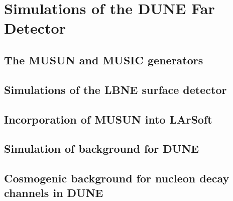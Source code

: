 
\chapter{Simulations of the DUNE Far Detector}  %

\ifpdf
    \graphicspath{{FarDetectorSimulations/Figs/Raster/}{FarDetectorSimulations/Figs/PDF/}{FarDetectorSimulations/Figs/}}
\else
    \graphicspath{{FarDetectorSimulations/Figs/Vector/}{FarDetectorSimulations/Figs/}}
\fi

\section{The MUSUN and MUSIC generators} %

\section{Simulations of the LBNE surface detector} %

\section{Incorporation of MUSUN into LArSoft}  %

\section{Simulation of background for DUNE}  %

\section{Cosmogenic background for nucleon decay channels in DUNE}  %

